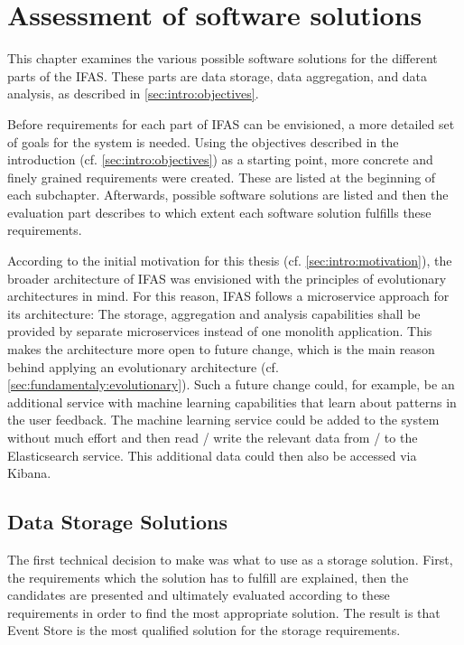 %
\chapter{Assessment of software solutions}
\label{ch:classifications}

This chapter examines the various possible software solutions for the different parts of the \acf{IFAS}.
These parts are data storage, data aggregation, and data analysis, as described in \cref{sec:intro:objectives}.

Before requirements for each part of \ac{IFAS} can be envisioned, a more detailed set of goals for the system is needed.
Using the objectives described in the introduction (cf. \cref{sec:intro:objectives}) as a starting point, more concrete and finely grained requirements were created.
These are listed at the beginning of each subchapter.
Afterwards, possible software solutions are listed and then the evaluation part describes to which extent each software solution fulfills these requirements.


According to the initial motivation for this thesis (cf. \cref{sec:intro:motivation}), the broader architecture of \ac{IFAS} was envisioned with the principles of evolutionary architectures in mind.
For this reason, \ac{IFAS} follows a microservice approach for its architecture: The storage, aggregation and analysis capabilities shall be provided by separate microservices instead of one monolith application.
This makes the architecture more open to future change, which is the main reason behind applying an evolutionary architecture (cf. \cref{sec:fundamentaly:evolutionary}).
Such a future change could, for example, be an additional service with machine learning capabilities that learn about patterns in the user feedback.
The machine learning service could be added to the system without much effort and then read / write the relevant data from / to the Elasticsearch service.
This additional data could then also be accessed via Kibana.

\section{Data Storage Solutions}
\label{sec:classifications:storage}

The first technical decision to make was what to use as a storage solution.
First, the requirements which the solution has to fulfill are explained, then the candidates are presented and ultimately evaluated according to these requirements in order to find the most appropriate solution.
The result is that Event Store is the most qualified solution for the storage requirements.


